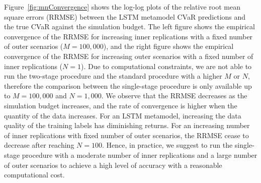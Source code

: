 \documentclass{article}
\begin{document}
Figure~\ref{fig:mnConvergence} shows the log-log plots of the relative root mean square errors (RRMSE) between the LSTM metamodel CVaR predictions and the true CVaR against the simulation budget.
The left figure shows the empirical convergence of the RRMSE for increasing inner replications with a fixed number of outer scenarios ($M=100\!,\!000$), and the right figure shows the empirical convergence of the RRMSE for increasing outer scenarios with a fixed number of inner replications ($N=1$).
Due to computational constraints, we are not able to run the two-stage procedure and the standard procedure with a higher $M$ or $N$, therefore the comparison between the single-stage procedure is only available up to $M = 100\!,000$ and $N = 1\!,000$.
We observe that the RRMSE decreases as the simulation budget increases, and the rate of convergence is higher when the quantity of the data increases.
For an LSTM metamodel, increasing the data quality of the training labels has diminishing returns.
For an increasing number of inner replications with fixed number of outer scenarios, the RRMSE cease to decrease after reaching $N = 100$. 
Hence, in practice, we suggest to run the single-stage procedure with a moderate number of inner replications and a large number of outer scenarios to achieve a high level of accuracy with a reasonable computational cost.
\end{document}
